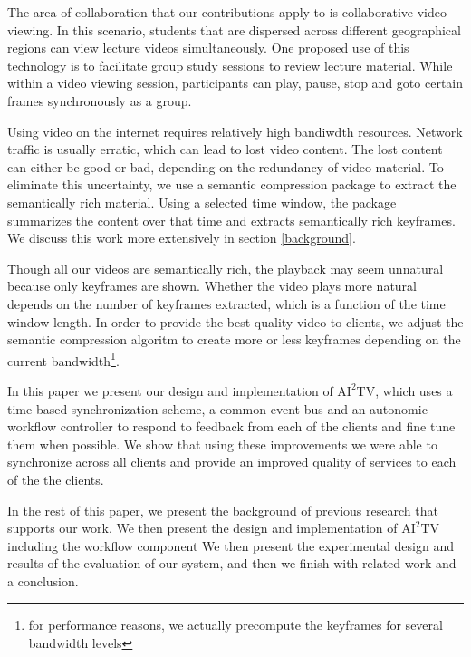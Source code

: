 \documentclass{sig-alternate}
\begin{document}
The area of collaboration that our contributions apply to is
collaborative video viewing.  In this scenario, students that are
dispersed across different geographical regions can view lecture
videos simultaneously.  One proposed use of this technology is to
facilitate group study sessions to review lecture material.  While
within a video viewing session, participants can play, pause, stop and
goto certain frames synchronously as a group.

Using video on the internet requires relatively high bandiwdth
resources.  Network traffic is usually erratic, which can lead to lost
video content.  The lost content can either be good or bad, depending
on the redundancy of video material.  To eliminate this uncertainty,
we use a semantic compression package \cite{TIECHENG} to extract the
semantically rich material.  Using a selected time window, the package
summarizes the content over that time and extracts semantically rich
keyframes.  We discuss this work more extensively in section
\ref{background}.

Though all our videos are semantically rich, the playback may seem
unnatural because only keyframes are shown.  Whether the video plays
more natural depends on the number of keyframes extracted, which is a
function of the time window length.  In order to provide the best
quality video to clients, we adjust the semantic compression algoritm
to create more or less keyframes depending on the current
bandwidth\footnote{for performance reasons, we actually precompute the
keyframes for several bandwidth levels}.

In this paper we present our design and implementation of
$\mathrm{AI}^2$TV, which uses a time based synchronization scheme, a
common event bus and an autonomic workflow controller to respond to
feedback from each of the clients and fine tune them when possible.
We show that using these improvements we were able to synchronize
across all clients and provide an improved quality of services to each
of the the clients.

In the rest of this paper, we present the background of previous
research that supports our work.  We then present the design and
implementation of $\mathrm{AI}^2$TV including the workflow component
We then present the experimental design and results of the evaluation
of our system, and then we finish with related work and a conclusion.
\end{document}
